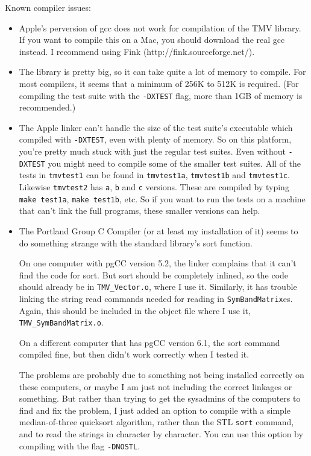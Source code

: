 \documentclass[twoside,letterpaper,11pt]{article}
\renewcommand{\tt}[1]{{\texttt {#1}}}
\begin{document}
Known compiler issues:
\begin{itemize}
\item
Apple's perversion of gcc does not work for compilation of the TMV library.  If you
want to compile this on a Mac, you should download the real gcc instead.  I 
recommend using Fink (http://fink.sourceforge.net/).

\item
The library is pretty big, so it can take quite a lot of memory to compile. 
For most compilers, it seems that a minimum of 256K to 512K is required.
(For compiling the test suite with the \tt{-DXTEST} flag, more than 
1GB of memory is recommended.)

\item
The Apple linker can't handle the size of the test suite's executable which compiled 
with \tt{-DXTEST}, even with plenty of memory.  So on this platform, you're 
pretty much stuck with just the regular test suites.  Even without \tt{-DXTEST}
you might need to compile some of the smaller test suites.  All of the tests
in \tt{tmvtest1} can be found in \tt{tmvtest1a}, \tt{tmvtest1b} and \tt{tmvtest1c}.
Likewise \tt{tmvtest2} has \tt{a}, \tt{b} and \tt{c} versions.  These are 
compiled by typing \tt{make test1a}, \tt{make test1b}, etc.  So if you want
to run the tests on a machine that can't link the full programs, these
smaller versions can help.

\item
The Portland Group C Compiler (or at least my installation of it) seems to 
do something
strange with the standard library's sort function. 

On one computer with pgCC version 5.2, the linker complains 
that it can't find the code for sort.  But sort should be completely inlined,
so the code should already be in \tt{TMV\_Vector.o}, where I use it.
Similarly, it has trouble linking the string read commands needed for reading
in \tt{SymBandMatrix}es.  Again, this should be included in the object file where 
I use it, \tt{TMV\_SymBandMatrix.o}.

On a different computer that has pgCC version 6.1, the sort command compiled
fine, but then didn't work correctly when I tested it.

The problems are probably due to something not being installed correctly on these
computers, or maybe I am just not including the correct linkages or something.  
But rather than trying to get the sysadmins of the
computers to find and fix the problem, 
I just added an option to compile with a simple median-of-three
quicksort algorithm, rather than the STL \tt{sort} command, and to read the strings
in character by character.  You can use this option by compiling with the 
flag \tt{-DNOSTL}.  


\end{itemize}
\end{document}
